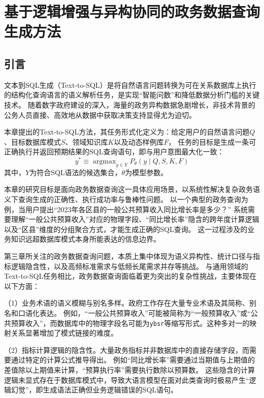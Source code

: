 \chapter{基于逻辑增强与异构协同的政务数据查询生成方法}\label{chap:text2sql}

\section{引言}

文本到SQL生成（Text-to-SQL）是将自然语言问题转换为可在关系数据库上执行的结构化查询语言的语义解析任务\cite{liu2025survey}，是实现“智能问数”和降低数据分析门槛的关键技术。
随着数字政府建设的深入，海量的政务异构数据急剧增长，非技术背景的公务人员直接、高效地从数据中获取决策支持显得尤为迫切。
\par
本章提出的Text-to-SQL方法，其任务形式化定义为：给定用户的自然语言问题$Q$、目标数据库模式$S$、领域知识库$K$以及动态样例库$F$，
任务的目标是生成一条可正确执行并返回预期结果的SQL查询语句，即与用户意图最大化一致：
\begin{equation}
y^* \equiv \mathop{\arg\max}_{y \in Y} P_{\theta}(y \mid Q, S, K, F)
\label{eq:task_def}
\end{equation}
其中，$Y$为符合SQL语法的候选集合，$\theta$为模型参数。

本章的研究目标是面向政务数据查询这一具体应用场景，以系统性解决复杂政务语义下查询生成的正确性、执行成功率与鲁棒性问题。
以一个典型的政务查询为例，当用户提出“2023年各区县的一般公共预算收入同比增长率是多少？”
系统需要理解“一般公共预算收入”对应的物理字段、“同比增长率”隐含的跨年度计算逻辑以及“区县”维度的分组聚合方式，才能生成正确的SQL查询。
这一过程涉及的业务知识远超数据库模式本身所能表达的信息边界。

第三章所关注的政务数据查询问题，本质上集中体现为语义异构性、统计口径与指标逻辑隐含性，以及高频标准需求与低频长尾需求并存等挑战。
与通用领域的Text-to-SQL任务相比，政务数据查询面临着更为突出的复杂性挑战，主要体现在以下方面：

（1）业务术语的语义模糊与别名多样。政府工作存在大量专业术语及其简称、别名和口语化表达。
例如，“一般公共预算收入”可能被简称为“一般预算收入”或“公共预算收入”，而数据库中的物理字段名可能为\texttt{ybsr}等缩写形式。这种多对一的映射关系显著增加了模式链接的难度。

（2）指标计算逻辑的隐含性。大量政务指标并非数据库中的直接存储字段，而需要通过特定的计算公式推导得出。
例如“同比增长率”需要通过当期值与上期值的差值除以上期值来计算，“预算执行率”需要执行数除以预算数。
这些隐含的计算逻辑未显式存在于数据库模式中，导致大语言模型在面对此类查询时极易产生“逻辑幻觉”，即生成语法正确但业务逻辑错误的SQL语句。

